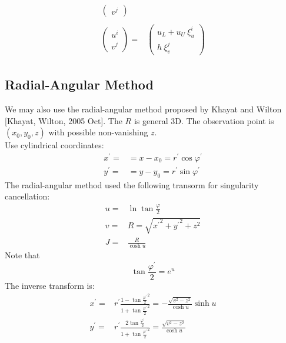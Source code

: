 \documentclass [10pt,letterpaper]{article}
\begin{document}
\begin{subequations}
\begin{align}
\begin{split}
\begin{pmatrix}
				v^j
			\end{pmatrix}
		\end{split}
		\\
		\begin{split} 
			\begin{pmatrix}
				u^i					\\
				v^j
			\end{pmatrix}
			=&
			\begin{pmatrix}
				u_L
				+ 
				u_U
				\ \xi_u^i				\\
				h
				\ \xi_v^j
			\end{pmatrix}
		\end{split}
	\end{align}
\end{subequations}
\subsection{Radial-Angular Method}
\label{sub:radial-angular-method}
We may also use the radial-angular method proposed by Khayat and Wilton [Khayat, Wilton, 2005 Oct].
The $R$ is general 3D.
The observation point is $(x_0,y_0,z)$ with possible non-vanishing $z$.
\\
Use cylindrical coordinates:
\begin{subequations} \label{eq:def-radial-angular-method-xp-yp-rp-varphip}
	\begin{align} 
		x^{\prime} =& = x-x_0 = r^{\prime} \cos{\varphi^{\prime}}	\\
		y^{\prime} =& = y-y_0 = r^{\prime} \sin{\varphi^{\prime}}
	\end{align}
\end{subequations}
The radial-angular method used the following transorm for singularity cancellation:
\begin{subequations} \label{eq:def-radial-angular-method-u-v-J}
	\begin{align}
		u =& \ln{\tan{\frac{\varphi}{2}}}				\\
		v =& R = \sqrt{ {x^{\prime}}^2 + {y^{\prime}}^2 + z^2 }		\\
		J =& \frac{R}{\cosh{u}}
	\end{align}
\end{subequations}
Note that
\begin{equation} \label{eq:radial-angular-method-tanvarphiover2-eu}
	\tan{\frac{\varphi^{\prime}}{2}} = e^{u}
\end{equation}
The inverse transform is:
\begin{subequations} \label{eq:radial-angular-method-xp-yp-u-v}
	\begin{align}
		x^{\prime} 
		=& 
			r^{\prime}
			\frac
			{ 1-{\tan{\frac{\varphi^{\prime}}{2}}}^2 }
			{ 1+{\tan{\frac{\varphi^{\prime}}{2}}}^2 }
		=
			-
			\frac{ \sqrt{v^2-z^2} } { \cosh{u} }
			\sinh{u}
		\\
		y^{\prime}
		=& 
			r^{\prime}
			\frac
			{ 2 \tan{\frac{\varphi^{\prime}}{2}} }
			{ 1+{\tan{\frac{\varphi^{\prime}}{2}}}^2 }
		= 
			\frac{ \sqrt{v^2-z^2} } { \cosh{u} }
	\end{align}
\end{subequations}
\end{document}
